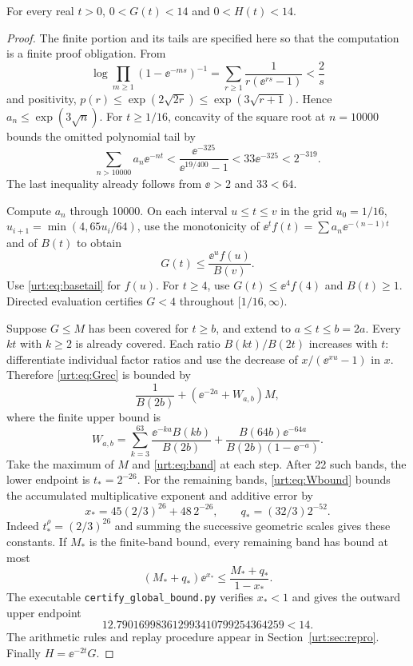 \documentclass[11pt,letterpaper]{article}
\theoremstyle{remark}\newtheorem{remark}[theorem]{Remark}
\begin{document}
\begin{proposition}\label{urt:prop:global}
For every real $t>0$, $0<G(t)<14$ and $0<H(t)<14$.
\end{proposition}
\begin{proof}
The finite portion and its tails are specified here so that the computation is a finite proof obligation. From
\[
 \log\prod_{m\ge1}(1-\ee^{-ms})^{-1}
 =\sum_{r\ge1}\frac1{r(\ee^{rs}-1)}<\frac2s
\]
and positivity, $p(r)\le\exp(2\sqrt{2r})\le\exp(3\sqrt{r+1})$. Hence $a_n\le\exp(3\sqrt n)$. For $t\ge1/16$, concavity of the square root at $n=10000$ bounds the omitted polynomial tail by
\begin{equation}\label{urt:eq:basetail}
 \sum_{n>10000}a_n\ee^{-nt}
 <\frac{\ee^{-325}}{\ee^{19/400}-1}
 <33\ee^{-325}<2^{-319}.
\end{equation}
The last inequality already follows from $\ee>2$ and $33<64$.

Compute $a_n$ through 10000. On each interval $u\le t\le v$ in the grid $u_0=1/16$, $u_{i+1}=\min(4,65u_i/64)$, use the monotonicity of $\ee^tf(t)=\sum a_n\ee^{-(n-1)t}$ and of $B(t)$ to obtain
\[
 G(t)\le\frac{\ee^u f(u)}{B(v)}.
\]
Use \eqref{urt:eq:basetail} for $f(u)$. For $t\ge4$, use $G(t)\le\ee^4f(4)$ and $B(t)\ge1$. Directed evaluation certifies $G<4$ throughout $[1/16,\infty)$.

Suppose $G\le M$ has been covered for $t\ge b$, and extend to $a\le t\le b=2a$. Every $kt$ with $k\ge2$ is already covered. Each ratio $B(kt)/B(2t)$ increases with $t$: differentiate individual factor ratios and use the decrease of $x/(\ee^{xu}-1)$ in $x$. Therefore \eqref{urt:eq:Grec} is bounded by
\begin{equation}\label{urt:eq:band}
 \frac1{B(2b)}+\left(\ee^{-2a}+W_{a,b}\right)M,
\end{equation}
where the finite upper bound is
\[
 W_{a,b}=\sum_{k=3}^{63}\frac{\ee^{-ka}B(kb)}{B(2b)}
  +\frac{B(64b)\ee^{-64a}}{B(2b)(1-\ee^{-a})}.
\]
Take the maximum of $M$ and \eqref{urt:eq:band} at each step. After 22 such bands, the lower endpoint is $t_*=2^{-26}$. For the remaining bands, \eqref{urt:eq:Wbound} bounds the accumulated multiplicative exponent and additive error by
\begin{equation}\label{urt:eq:globaltail}
 x_*=45(2/3)^{26}+48\,2^{-26},\qquad q_*=(32/3)2^{-52}.
\end{equation}
Indeed $t_*^\rho=(2/3)^{26}$ and summing the successive geometric scales gives these constants. If $M_*$ is the finite-band bound, every remaining band has bound at most
\[
 (M_*+q_*)\ee^{x_*}\le\frac{M_*+q_*}{1-x_*}.
\]
The executable \texttt{certify\_global\_bound.py} verifies $x_*<1$ and gives the outward upper endpoint
\[
 12.790169983612993410799254364259<14.
\]
The arithmetic rules and replay procedure appear in Section~\ref{urt:sec:repro}. Finally $H=\ee^{-2t}G$.
\end{proof}
\end{document}
